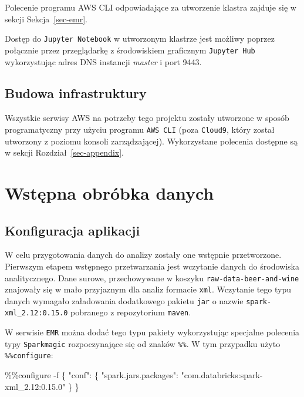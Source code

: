 \documentclass[
  letterpaper,
  DIV=11,
  numbers=noendperiod]{scrreprt}
\newenvironment{Shaded}{\begin{snugshade}}{\end{snugshade}}
\newcommand{\NormalTok}[1]{\textcolor[rgb]{0.00,0.23,0.31}{#1}}
\newcommand{\OperatorTok}[1]{\textcolor[rgb]{0.37,0.37,0.37}{#1}}
\newcommand{\StringTok}[1]{\textcolor[rgb]{0.13,0.47,0.30}{#1}}
\begin{document}
Polecenie programu AWS CLI odpowiadające za utworzenie klastra zajduje
się w sekcji Sekcja~\ref{sec-emr}.

Dostęp do \texttt{Jupyter\ Notebook} w utworzonym klastrze jest możliwy
poprzez połącznie przez przeglądarkę z środowiskiem graficznym
\texttt{Jupyter\ Hub} wykorzystując adres DNS instancji \emph{master} i
port 9443.

\hypertarget{budowa-infrastruktury}{%
\section{Budowa infrastruktury}\label{budowa-infrastruktury}}

Wszystkie serwisy AWS na potrzeby tego projektu zostały utworzone w
sposób programatyczny przy użyciu programu \texttt{AWS\ CLI} (poza
\texttt{Cloud9}, który został utworzony z poziomu konsoli
zarządzającej). Wykorzystane polecenia dostępne są w sekcji
Rozdział~\ref{sec-appendix}.

\hypertarget{wstux119pna-obruxf3bka-danych}{%
\chapter{Wstępna obróbka danych}\label{wstux119pna-obruxf3bka-danych}}

\hypertarget{konfiguracja-aplikacji}{%
\section{Konfiguracja aplikacji}\label{konfiguracja-aplikacji}}

W celu przygotowania danych do analizy zostały one wstępnie
przetworzone. Pierwszym etapem wstępnego przetwarzania jest wczytanie
danych do środowiska analitycznego. Dane surowe, przechowywane w koszyku
\texttt{raw-data-beer-and-wine} znajowały się w mało przyjaznym dla
analiz formacie \texttt{xml}. Wczytanie tego typu danych wymagało
załadowania dodatkowego pakietu \texttt{jar} o nazwie
\texttt{spark-xml\_2.12:0.15.0} pobranego z repozytorium \texttt{maven}.

W serwisie \texttt{EMR} można dodać tego typu pakiety wykorzystując
specjalne polecenia typy \texttt{Sparkmagic} rozpoczynające się od
znaków \texttt{\%\%}. W tym przypadku użyto \texttt{\%\%configure}:

\small

\begin{Shaded}
\begin{Highlighting}[]
\OperatorTok{\%\%}\NormalTok{configure }\OperatorTok{{-}}\NormalTok{f}
\NormalTok{\{}
    \StringTok{"conf"}\NormalTok{: \{}
        \StringTok{"spark.jars.packages"}\NormalTok{: }\StringTok{"com.databricks:spark{-}xml\_2.12:0.15.0"}
\NormalTok{    \}}
\NormalTok{\}}
\end{Highlighting}
\end{Shaded}
\end{document}

